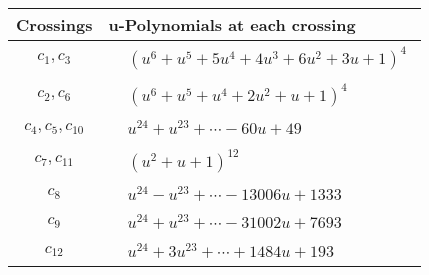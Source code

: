 \documentclass[1p]{elsarticle_modified}
\theoremstyle{definition}
\begin{document}
\begin{tabular}{m{50pt}|m{274pt}}
Crossings & \hspace{64pt}u-Polynomials at each crossing \\
\hline $$\begin{aligned}c_{1},c_{3}\end{aligned}$$&$\begin{aligned}
&(u^6+u^5+5 u^4+4 u^3+6 u^2+3 u+1)^4
\end{aligned}$\\
\hline $$\begin{aligned}c_{2},c_{6}\end{aligned}$$&$\begin{aligned}
&(u^6+u^5+u^4+2 u^2+u+1)^4
\end{aligned}$\\
\hline $$\begin{aligned}c_{4},c_{5},c_{10}\end{aligned}$$&$\begin{aligned}
&u^{24}+u^{23}+\cdots-60 u+49
\end{aligned}$\\
\hline $$\begin{aligned}c_{7},c_{11}\end{aligned}$$&$\begin{aligned}
&(u^2+u+1)^{12}
\end{aligned}$\\
\hline $$\begin{aligned}c_{8}\end{aligned}$$&$\begin{aligned}
&u^{24}- u^{23}+\cdots-13006 u+1333
\end{aligned}$\\
\hline $$\begin{aligned}c_{9}\end{aligned}$$&$\begin{aligned}
&u^{24}+u^{23}+\cdots-31002 u+7693
\end{aligned}$\\
\hline $$\begin{aligned}c_{12}\end{aligned}$$&$\begin{aligned}
&u^{24}+3 u^{23}+\cdots+1484 u+193
\end{aligned}$\\
\hline
\end{tabular}\\~\\
\newpage\renewcommand{\arraystretch}{1}
\end{document}
